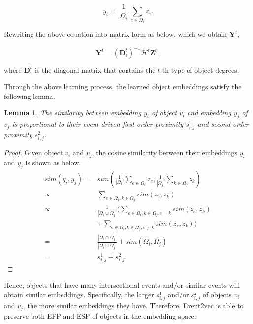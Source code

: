 \begin{equation}\label{equation11}
y_i = \frac{1}{|\Omega_i|}\sum_{e\in\Omega_i}z_e.
\end{equation}

\noindent Rewriting the above equation into matrix form as below, which we obtain $\textbf{Y}^t$,

\begin{equation}\label{equation12}
\textbf{Y}^t = (\textbf{D}_v^t)^{-1} \mathcal{H}^t \textbf{Z}^t,
\end{equation}

\noindent where $\textbf{D}_v^t$ is the diagonal matrix that contains the $t$-th type of object degrees.
\smallskip

Through the above learning process, the learned object embeddings satisfy the following lemma,
\newtheorem{myprop}{Lemma}
\begin{myprop}
	The similarity between embedding $y_i$ of object $v_i$ and embedding $y_j$ of $v_j$ is proportional to their event-driven first-order proximity $s_{i,j}^1$ and second-order proximity $s_{i,j}^2$.
\end{myprop}
\begin{proof}
	Given object $v_i$ and $v_j$, the cosine similarity between their embeddings $y_i$ and $y_j$ is shown as below.
	\begin{equation}\label{equation13}
	\begin{aligned}
	sim(y_i, y_j) = {} & sim(\frac{1}{|\Omega_i|}\sum_{e\in\Omega_i}z_e,  \frac{1}{|\Omega_j|}\sum_{k\in\Omega_j}z_k) \\
	\propto {} & \sum_{e\in\Omega_i,k\in\Omega_j}sim(z_e, z_k) \\
	\propto {} & \frac{1}{|\Omega_i\cup\Omega_j|}(\sum_{e\in\Omega_i,k\in\Omega_j,e=k}sim(z_e, z_k) \\ 
	& + \sum_{e\in\Omega_i,k\in\Omega_j,e\neq k}sim(z_e, z_k))  \\
	= {} & \frac{|\Omega_i\cap\Omega_j|}{|\Omega_i\cup\Omega_j|} + sim(\Omega_i, \Omega_j) \\
	= {} & s_{i,j}^1 + s_{i,j}^2.
	\end{aligned}
	\end{equation}
\end{proof}
Hence, objects that have many intersectional events and$/$or similar events will obtain similar embeddings. Specifically, the larger $s_{i,j}^1$ and$/$or $s_{i,j}^2$ of objects $v_i$ and $v_j$, the more similar embeddings they have. Therefore, Event2vec is able to preserve both EFP and ESP of objects in the embedding space.
\smallskip

